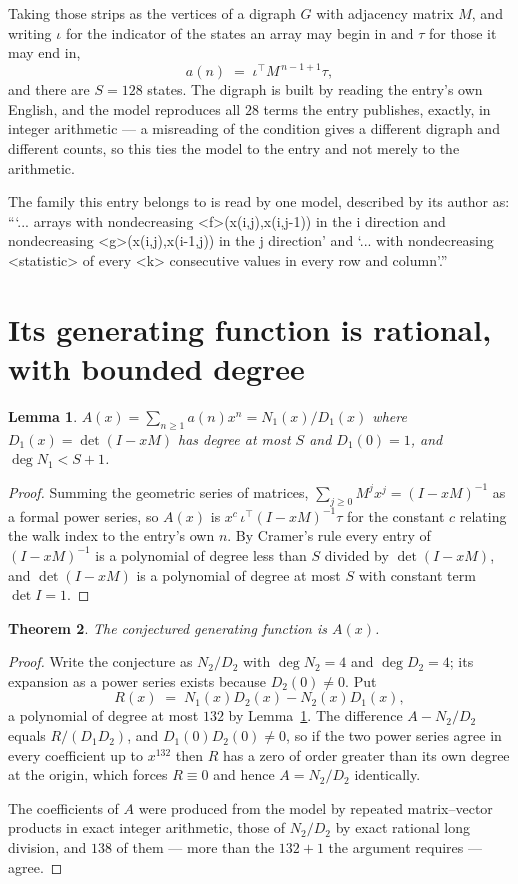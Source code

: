 \documentclass[11pt,a4paper]{article}
\theoremstyle{plain}
\newtheorem{theorem}{Theorem}
\newtheorem{lemma}[theorem]{Lemma}
\theoremstyle{definition}
\begin{document}
Taking those strips as the vertices of a digraph $G$ with adjacency matrix $M$, and writing
$\iota$ for the indicator of the states an array may begin in and $\tau$ for those it may end
in,
\[
a(n)\;=\;\iota^{\!\top}M^{\,n-1+1}\tau ,
\]
and there are $S=128$ states. The digraph is built by reading the entry's own English, and the
model reproduces all $28$ terms the entry publishes, exactly, in integer arithmetic --- a
misreading of the condition gives a different digraph and different counts, so this ties the
model to the entry and not merely to the arithmetic.

The family this entry belongs to is read by one model, described by its author as: ```... arrays with nondecreasing <f>(x(i,j),x(i,j-1)) in the i direction and nondecreasing <g>(x(i,j),x(i-1,j)) in the j direction' and `... with nondecreasing <statistic> of every <k> consecutive values in every row and column'.''


\section{Its generating function is rational, with bounded degree}

\begin{lemma}\label{lem:rat}
$A(x)=\sum_{n\ge1}a(n)x^n=N_1(x)/D_1(x)$ where $D_1(x)=\det(I-xM)$ has degree at most
$S$ and $D_1(0)=1$, and $\deg N_1<S+1$.
\end{lemma}

\begin{proof}
Summing the geometric series of matrices, $\sum_{j\ge0}M^jx^j=(I-xM)^{-1}$ as a formal
power series, so $A(x)$ is $x^{c}\,\iota^{\!\top}(I-xM)^{-1}\tau$ for the constant $c$
relating the walk index to the entry's own $n$. By Cramer's rule every entry of
$(I-xM)^{-1}$ is a polynomial of degree less than $S$ divided by $\det(I-xM)$, and
$\det(I-xM)$ is a polynomial of degree at most $S$ with constant term $\det I=1$.
\end{proof}

\begin{theorem}
The conjectured generating function is $A(x)$.
\end{theorem}

\begin{proof}
Write the conjecture as $N_2/D_2$ with $\deg N_2=4$ and $\deg D_2=4$; its expansion as a
power series exists because $D_2(0)\neq0$. Put
\[
R(x)\;=\;N_1(x)D_2(x)-N_2(x)D_1(x),
\]
a polynomial of degree at most $132$ by Lemma~\ref{lem:rat}. The difference
$A-N_2/D_2$ equals $R/(D_1D_2)$, and $D_1(0)D_2(0)\neq0$, so if the two power series agree in
every coefficient up to $x^{132}$ then $R$ has a zero of order greater than its own
degree at the origin, which forces $R\equiv0$ and hence $A=N_2/D_2$ identically.

The coefficients of $A$ were produced from the model by repeated matrix--vector products in
exact integer arithmetic, those of $N_2/D_2$ by exact rational long division, and $138$
of them --- more than the $132+1$ the argument requires --- agree.
\end{proof}
\end{document}
